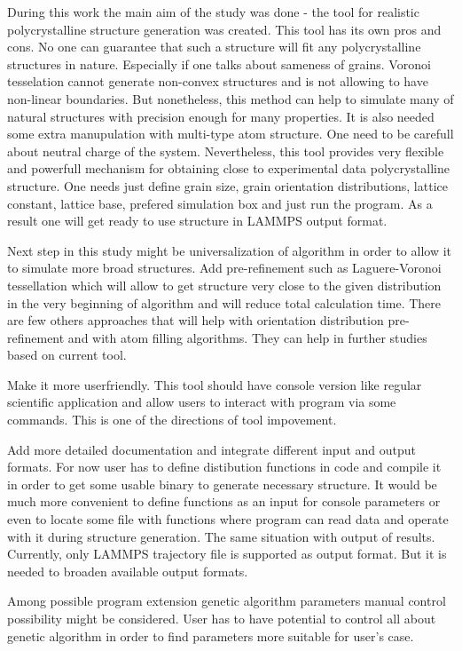 \documentclass[12pt]{report}
\begin{document}
During this work the main aim of the study was done - the tool for realistic polycrystalline structure generation was created. This tool has its own pros and cons. No one can guarantee that such a structure will fit any polycrystalline structures in nature. Especially if one talks about sameness of grains. Voronoi tesselation cannot generate non-convex structures and is not allowing to have non-linear boundaries. But nonetheless, this method can help to simulate many of natural structures with precision enough for many properties. It is also needed some extra manupulation with multi-type atom structure. One need to be carefull about neutral charge of the system. Nevertheless, this tool provides very flexible and powerfull mechanism for obtaining close to experimental data polycrystalline structure. One needs just define grain size, grain orientation distributions, lattice constant, lattice base, prefered simulation box and just run the program. As a result one will get ready to use structure in LAMMPS output format.

Next step in this study might be universalization of algorithm in order to allow it to simulate more broad structures. Add pre-refinement such as Laguere-Voronoi tessellation which will allow to get structure very close to the given distribution in the very beginning of algorithm and will reduce total calculation time. There are few others approaches that will help with orientation distribution pre-refinement and with atom filling algorithms. They can help in further studies based on current tool.

Make it more userfriendly. This tool should have console version like regular scientific application and allow users to interact with program via some commands. This is one of the directions of tool impovement.

Add more detailed documentation and integrate different input and output formats. For now user has to define distibution functions in code and compile it in order to get some usable binary to generate necessary structure. It would be much more convenient to define functions as an input for console parameters or even to locate some file with functions where program can read data and operate with it during structure generation. The same situation with output of results. Currently, only LAMMPS trajectory file is supported as output format. But it is needed to broaden available output formats.

Among possible program extension genetic algorithm parameters manual control possibility might be considered. User has to have potential to control all about genetic algorithm in order to find parameters more suitable for user's case.
\end{document}
